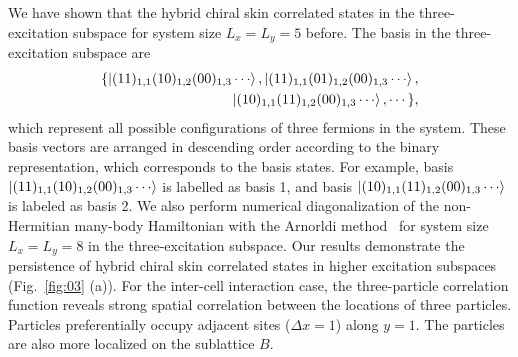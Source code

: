 \documentclass[longbibliography, aps, prx, amsmath, amssymb, amsfonts, twocolumn,superscriptaddress, footinbib]{revtex4-1}
\begin{document}
	We have shown that the hybrid chiral skin correlated states in the three-excitation subspace for system size $L_x = L_y =5$ before.
	The basis in the three-excitation subspace are
	\begin{equation}
		\begin{split}
		\{\ket{(11)_{1,1}(10)_{1,2}(00)_{1,3}\cdots}, \ket{(11)_{1,1}(01)_{1,2}(00)_{1,3}\cdots}, \\
		\ket{(10)_{1,1}(11)_{1,2}(00)_{1,3}\cdots},\cdots\}, 
		\end{split}
	\end{equation}
	which represent all possible configurations of three fermions in the system. 
    These basis vectors are arranged in descending order according to the binary representation, which corresponds to the basis states. For example, basis $\ket{(11)_{1,1}(10)_{1,2}(00)_{1,3}\cdots}$ is labelled as basis 1, and basis $\ket{(10)_{1,1}(11)_{1,2}(00)_{1,3}\cdots}$ is labeled as basis 2. 
	We also perform numerical diagonalization of the non-Hermitian many-body Hamiltonian with the Arnorldi method~\cite{arnoldi1951principle} for system size $L_x = L_y = 8$ in the three-excitation subspace. Our results demonstrate the persistence of hybrid chiral skin correlated states in higher excitation subspaces (Fig.~\ref{fig:03} (a)).
	For the inter-cell interaction case, the three-particle correlation function reveals strong spatial correlation between the locations of three particles. Particles preferentially occupy adjacent sites ($\Delta x =1$) along $y=1$. The particles are also more localized on the sublattice $B$. 
\end{document}
